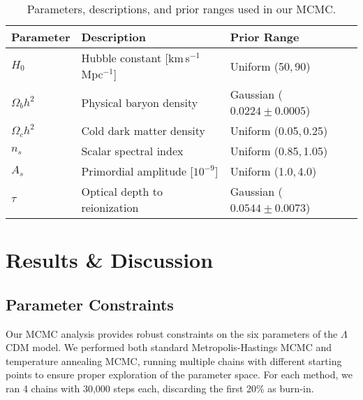 \documentclass[11pt]{article}
\theoremstyle{definition}
\begin{document}
\begin{table}[h!]
  \centering
  \small
  \caption{Parameters, descriptions, and prior ranges used in our MCMC.}
  \label{tab:params}
  \begin{tabular}{l l l}
    \toprule
    \textbf{Parameter} & \textbf{Description}                      & \textbf{Prior Range}         \\
    \midrule
    $H_0$              & Hubble constant [km\,s$^{-1}$\,Mpc$^{-1}$] & Uniform (50,\,90)             \\
    $\Omega_bh^2$      & Physical baryon density                   & Gaussian ($0.0224\pm0.0005$)  \\
    $\Omega_ch^2$      & Cold dark matter density                  & Uniform (0.05,\,0.25)         \\
    $n_s$              & Scalar spectral index                     & Uniform (0.85,\,1.05)         \\
    $A_s$              & Primordial amplitude [$10^{-9}$]          & Uniform (1.0,\,4.0)           \\
    $\tau$             & Optical depth to reionization             & Gaussian ($0.0544\pm0.0073$)  \\
    \bottomrule
  \end{tabular}
\end{table}


\section{Results \& Discussion}

\subsection{Parameter Constraints}

Our MCMC analysis provides robust constraints on the six parameters of the $\Lambda$CDM model. We performed both standard Metropolis-Hastings MCMC and temperature annealing MCMC, running multiple chains with different starting points to ensure proper exploration of the parameter space. For each method, we ran 4 chains with 30,000 steps each, discarding the first 20\% as burn-in.
\end{document}
